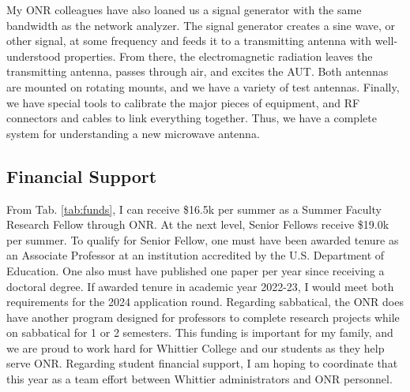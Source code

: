 \documentclass[../../../main.tex]{subfiles}
\begin{document}
My ONR colleagues have also loaned us a signal generator with the same bandwidth as the network analyzer.  The signal generator creates a sine wave, or other signal, at some frequency and feeds it to a transmitting antenna with well-understood properties.  From there, the electromagnetic radiation leaves the transmitting antenna, passes through air, and excites the AUT.  Both antennas are mounted on rotating mounts, and we have a variety of test antennas.  Finally, we have special tools to calibrate the major pieces of equipment, and RF connectors and cables to link everything together.  Thus, we have a complete system for understanding a new microwave antenna.

\subsection{Financial Support}

From Tab. \ref{tab:funds}, I can receive \$16.5k per summer as a Summer Faculty Research Fellow through ONR.  At the next level, Senior Fellows receive \$19.0k per summer.  To qualify for Senior Fellow, one must have been awarded tenure as an Associate Professor at an institution accredited by the U.S. Department of Education.  One also must have published one paper per year since receiving a doctoral degree.  If awarded tenure in academic year 2022-23, I would meet both requirements for the 2024 application round.  Regarding sabbatical, the ONR does have another program designed for professors to complete research projects while on sabbatical for 1 or 2 semesters.  This funding is important for my family, and we are proud to work hard for Whittier College and our students as they help serve ONR.  Regarding student financial support, I am hoping to coordinate that this year as a team effort between Whittier administrators and ONR personnel.
\end{document}
